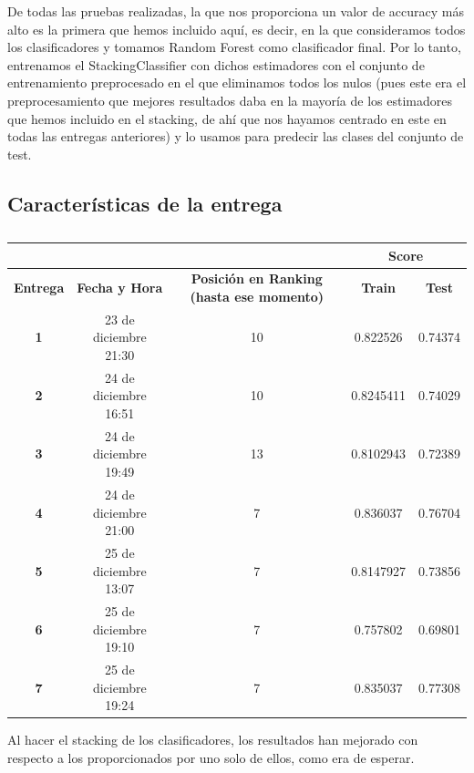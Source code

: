 \documentclass[a4paper,11pt]{article}
\begin{document}
De todas las pruebas realizadas, la que nos proporciona un valor de accuracy más alto es la primera que hemos incluido aquí, es decir, en la que consideramos todos los clasificadores y tomamos Random Forest como clasificador final. Por lo tanto, entrenamos el StackingClassifier con dichos estimadores con el conjunto de entrenamiento preprocesado en el que eliminamos todos los nulos (pues este era el preprocesamiento que mejores resultados daba en la mayoría de los estimadores que hemos incluido en el stacking, de ahí que nos hayamos centrado en este en todas las entregas anteriores) y lo usamos para predecir las clases del conjunto de test.\newpage

\subsection{Características de la entrega}
\begin{table}[htbp]
	\caption{}\begin{center}
	\begin{tabular}{|c|c|c|c|c|}
		\hline
		\multicolumn{1}{|l|}{\textbf{}} & \textbf{} & \textbf{} & \multicolumn{ 2}{c|}{\textbf{Score}} \\ \hline
		\textbf{Entrega} & \textbf{Fecha y Hora} & \textbf{Posición en Ranking (hasta ese momento)} & \textbf{Train} & \textbf{Test} \\ \hline
		\textbf{1} & 23 de diciembre 21:30 & 10 & 0.822526 & 0.74374 \\ \hline
		\textbf{2} &  24 de diciembre  16:51 & 10 & 0.8245411 & 0.74029 \\ \hline
		\textbf{3} & 24  de diciembre 19:49 & 13 & 0.8102943 & 0.72389 \\ \hline
		\textbf{4} & 24 de diciembre 21:00  & 7 & 0.836037 & 0.76704 \\ \hline
		\textbf{5} &  25 de diciembre 13:07 & 7 & 0.8147927 & 0.73856 \\ \hline
		\textbf{6} & 25  de diciembre  19:10  & 7 & 0.757802 & 0.69801 \\ \hline
		\textbf{7} & 25 de diciembre 19:24 & 7 & 0.835037 & 0.77308 \\ \hline
	\end{tabular}\end{center}
	\label{}
\end{table}

Al hacer el stacking de los clasificadores, los resultados han mejorado con respecto a los proporcionados por uno solo de ellos, como era de esperar. 
\end{document}
